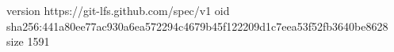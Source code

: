 version https://git-lfs.github.com/spec/v1
oid sha256:441a80ee77ac930a6ea572294c4679b45f122209d1c7eea53f52fb3640be8628
size 1591
